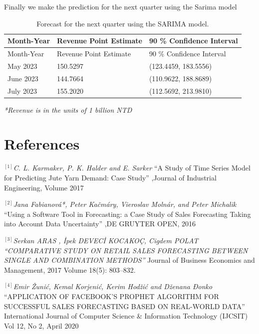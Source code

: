 \documentclass[
]{article}
\begin{document}
Finally we make the prediction for the next quarter using the Sarima
model

\begin{longtable}[]{@{}lll@{}}
\caption{Forecast for the next quarter using the SARIMA
model.}\tabularnewline
\toprule\noalign{}
Month-Year & Revenue Point Estimate & 90 \% Confidence Interval \\
\midrule\noalign{}
\endfirsthead
\toprule\noalign{}
Month-Year & Revenue Point Estimate & 90 \% Confidence Interval \\
\midrule\noalign{}
\endhead
\bottomrule\noalign{}
\endlastfoot
May 2023 & 150.5297 & (123.4459, 183.5556) \\
June 2023 & 144.7664 & (110.9622, 188.8689) \\
July 2023 & 155.2020 & (112.5692, 213.9810) \\
\end{longtable}

\emph{*Revenue is in the units of 1 billion NTD}

\hypertarget{references}{%
\section{References}\label{references}}

\(^{[1]}\)\emph{C. L. Karmaker, P. K. Halder and E. Sarker} ``A Study of
Time Series Model for Predicting Jute Yarn Demand: Case Study'' ,Journal
of Industrial Engineering, Volume 2017

\(^{[2]}\)\emph{Jana Fabianová*, Peter Kačmáry, Vieroslav Molnár, and
Peter Michalik} ``Using a Software Tool in Forecasting: a Case Study of
Sales Forecasting Taking into Account Data Uncertainty'' ,DE GRUYTER
OPEN, 2016

\(^{[3]}\)\emph{Serkan ARAS , İpek DEVECİ KOCAKOÇ, Cigdem POLAT
``COMPARATIVE STUDY ON RETAIL SALES FORECASTING BETWEEN SINGLE AND
COMBINATION METHODS''} Journal of Business Economics and Management,
2017 Volume 18(5): 803--832.

\(^{[4]}\)\emph{Emir Žunić, Kemal Korjenić, Kerim Hodžić and Dženana
Đonko} ``APPLICATION OF FACEBOOK'S PROPHET ALGORITHM FOR SUCCESSFUL
SALES FORECASTING BASED ON REAL-WORLD DATA'' International Journal of
Computer Science \& Information Technology (IJCSIT) Vol 12, No 2, April
2020
\end{document}
